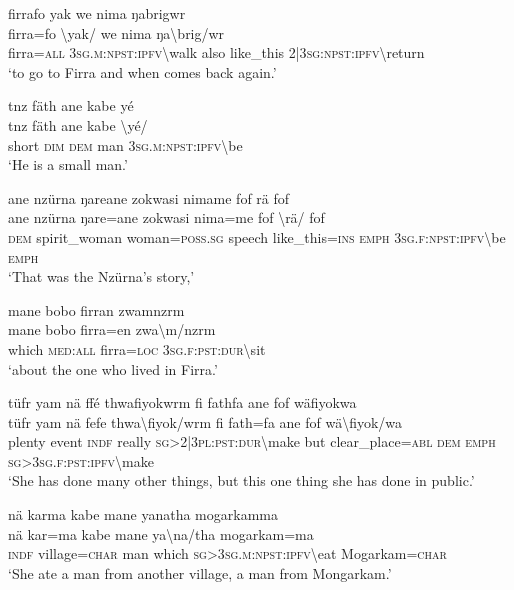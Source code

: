 \ea\label{ex:7:a4873}
firrafo yak we nima ŋabrigwr\\
\gll firra=fo	{\textbackslash}yak/	we	nima	ŋa{\textbackslash}brig/wr\\
     firra=\textsc{all}	3\textsc{sg}.\textsc{m}:\textsc{npst}:\textsc{ipfv}{\textbackslash}walk	also	like\_this	2|3\textsc{sg}:\textsc{npst}:\textsc{ipfv}{\textbackslash}return\\
\glt `to go to Firra and when comes back again.'
\z

\ea\label{ex:7:a4875}
tnz fäth ane kabe yé\\
\gll tnz	fäth	ane	kabe	{\textbackslash}yé/\\
     short	\textsc{dim}	\textsc{dem}	man	3\textsc{sg}.\textsc{m}:\textsc{npst}:\textsc{ipfv}{\textbackslash}be\\
\glt `He is a small man.'
\z

\ea\label{ex:7:a4876}
ane nzürna ŋareane zokwasi nimame fof rä fof\\
\gll ane	nzürna	ŋare=ane	zokwasi	nima=me	fof	{\textbackslash}rä/	fof\\
     \textsc{dem}	spirit\_woman	woman=\textsc{poss}.\textsc{sg}	speech	like\_this=\textsc{ins}	\textsc{emph}	3\textsc{sg}.\textsc{f}:\textsc{npst}:\textsc{ipfv}{\textbackslash}be	\textsc{emph}\\
\glt `That was the Nzürna's story,'
\z

\ea\label{ex:7:a4878}
mane bobo firran zwamnzrm\\
\gll mane	bobo	firra=en	zwa{\textbackslash}m/nzrm\\
     which	\textsc{med}:\textsc{all}	firra=\textsc{loc}	3\textsc{sg}.\textsc{f}:\textsc{pst}:\textsc{dur}{\textbackslash}sit\\
\glt `about the one who lived in Firra.'
\z

\ea\label{ex:7:a4879}
tüfr yam nä ffé thwafiyokwrm fi fathfa ane fof wäfiyokwa\\
\gll tüfr	yam	nä	fefe	thwa{\textbackslash}fiyok/wrm	fi	fath=fa	ane	fof	wä{\textbackslash}fiyok/wa\\
     plenty	event	\textsc{indf}	really	\textsc{sg}>2|3\textsc{pl}:\textsc{pst}:\textsc{dur}{\textbackslash}make	but	clear\_place=\textsc{abl}	\textsc{dem}	\textsc{emph}	\textsc{sg}>3\textsc{sg}.\textsc{f}:\textsc{pst}:\textsc{ipfv}{\textbackslash}make\\
\glt `She has done many other things, but this one thing she has done in public.'
\z

\ea\label{ex:7:a4881}
nä karma kabe mane yanatha mogarkamma\\
\gll nä	kar=ma	kabe	mane	ya{\textbackslash}na/tha	mogarkam=ma\\
     \textsc{indf}	village=\textsc{char}	man	which	\textsc{sg}>3\textsc{sg}.\textsc{m}:\textsc{npst}:\textsc{ipfv}{\textbackslash}eat	Mogarkam=\textsc{char}\\
\glt `She ate a man from another village, a man from Mongarkam.'
\z

